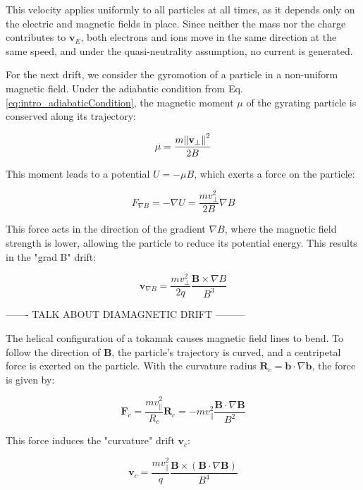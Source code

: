 This velocity applies uniformly to all particles at all times, as it depends only on the electric and magnetic fields in place. Since neither the mass nor the charge contributes to $\mathbf{v}_E$, both electrons and ions move in the same direction at the same speed, and under the quasi-neutrality assumption, no current is generated.

For the next drift, we consider the gyromotion of a particle in a non-uniform magnetic field. Under the adiabatic condition from Eq. \ref{eq:intro_adiabaticCondition}, the magnetic moment $\mu$ of the gyrating particle is conserved along its trajectory:

\begin{equation}
	\mu = \frac{m\norm{\mathbf{v}_\perp}^2}{2B}
\end{equation}

This moment leads to a potential $U = -\mu B$, which exerts a force on the particle:

\begin{equation}
	F_{\nabla B} = -\nabla U = \frac{mv_\perp^2}{2B}\nabla B
\end{equation}

This force acts in the direction of the gradient $\nabla B$, where the magnetic field strength is lower, allowing the particle to reduce its potential energy. This results in the "grad B" drift:

\begin{equation}
	\mathbf{v}_{\nabla B} = \frac{mv_\perp^2}{2q} \frac{\mathbf{B} \times \nabla B}{B^3}
\end{equation}

------- TALK ABOUT DIAMAGNETIC DRIFT ---------

The helical configuration of a tokamak causes magnetic field lines to bend. To follow the direction of $\mathbf{B}$, the particle's trajectory is curved, and a centripetal force is exerted on the particle. With the curvature radius $\mathbf{R}_c = \mathbf{b} \cdot \nabla \mathbf{b}$, the force is given by:

\begin{equation}
	\mathbf{F}_c = \frac{mv_\parallel^2}{R_c}\mathbf{R}_c = -mv_\parallel^2\frac{\mathbf{B} \cdot \nabla \mathbf{B}}{B^2}
\end{equation}

This force induces the "curvature" drift $\mathbf{v}_c$:

\begin{equation}
	\mathbf{v}_c = \frac{mv_\parallel^2}{q}\frac{\mathbf{B} \times (\mathbf{B} \cdot \nabla \mathbf{B})}{B^4}
\end{equation}

